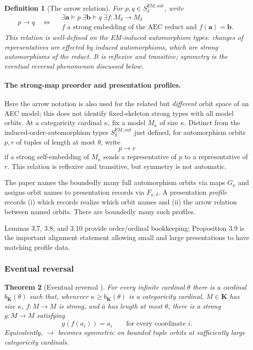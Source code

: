 \documentclass[11pt]{article}
\newcommand{\K}{\mathbf K}
\newcommand{\ba}{\mathbf{a}}
\newcommand{\bb}{\mathbf{b}}
\theoremstyle{plain}
\newtheorem{definition}{Definition}[section]
\newtheorem{theorem}[definition]{Theorem}
\begin{document}
\begin{definition}[The arrow relation]
For $p,q\in S^{\mathrm{EM,aut}}_\delta$, write
\[
p\longrightarrow q
\quad\Longleftrightarrow\quad
\begin{gathered}
\exists\ba\models p\;\exists\bb\models q\;
\exists f:M_\delta\longrightarrow M_\delta\\
\text{$f$ a strong embedding of the AEC reduct and }f(\ba)=\bb.
\end{gathered}
\]
This relation is well-defined on the EM-induced automorphism types: changes of
representatives are effected by induced automorphisms, which are
strong automorphisms of the reduct. It is reflexive and transitive;
symmetry is the eventual reversal phenomenon discussed below.
\end{definition}

\paragraph{The strong-map preorder and presentation profiles.}
Here the arrow notation is also used for the related but
\emph{different} orbit space of an AEC model; this does not
identify fixed-skeleton strong types with all model orbits.
At a categoricity cardinal $\kappa$, fix a model $M_\kappa$ of size $\kappa$. Distinct from the induced-order-automorphism types $S^{\mathrm{EM,aut}}_\delta$ just defined, for automorphism orbits $p,r$ of tuples of length at most $\theta$, write
\[
p\longrightarrow r
\]
if a strong self-embedding of $M_\kappa$ sends a representative of $p$ to a representative of $r$. This relation is reflexive and transitive, but symmetry is not automatic.

The paper names the boundedly many full automorphism orbits via maps $G_\kappa$ and assigns orbit names to presentation records via $F_{\kappa,\delta}$. A presentation \emph{profile} records (i) which records realize which orbit names and (ii) the arrow relation between named orbits. There are boundedly many such profiles.

Lemmas 3.7, 3.8, and 3.10 provide order/ordinal bookkeeping; Proposition 3.9 is the important alignment statement allowing small and large presentations to have matching profile data.


\subsubsection*{Eventual reversal}
\begin{theorem}[Eventual reversal {\cite[Theorem 3.11]{oai-ecc}}]\label{thm:reversal}
For every infinite cardinal $\theta$ there is a cardinal $b_\K(\theta)$ such that, whenever $\kappa\geq b_\K(\theta)$ is a categoricity cardinal, $M\in\K$ has size $\kappa$, $f:M\to M$ is strong, and $\bar a$ has length at most $\theta$, there is a strong $g:M\to M$ satisfying
\[
g(f(a_i))=a_i\qquad\text{for every coordinate }i.
\]
Equivalently, $\longrightarrow$ becomes symmetric on bounded tuple orbits at sufficiently large categoricity cardinals.
\end{theorem}
\end{document}
